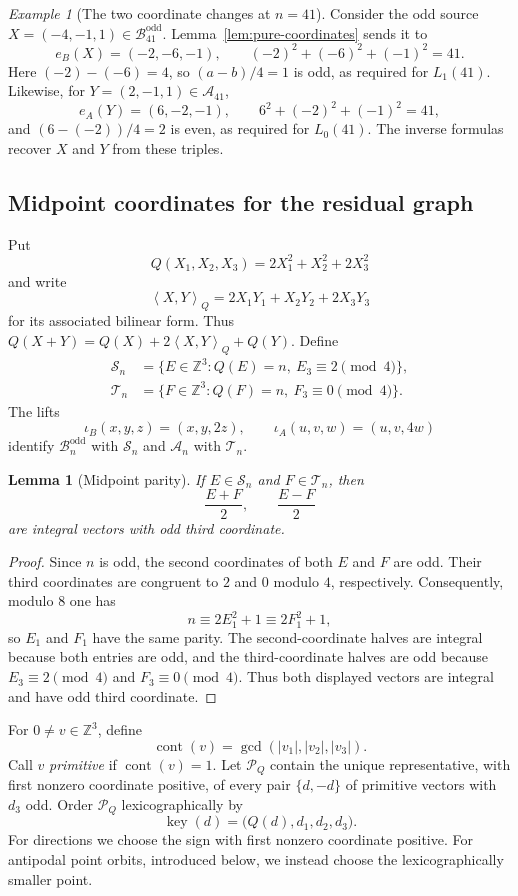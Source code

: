 \documentclass[11pt]{amsart}
\newtheorem{lemma}[theorem]{Lemma}
\theoremstyle{definition}
\theoremstyle{remark}
\newtheorem{example}[theorem]{Example}
\newcommand{\Z}{\mathbb Z}
\newcommand{\An}{\mathcal A_n}
\newcommand{\Bodd}{\mathcal B_n^{\mathrm{odd}}}
\newcommand{\Sn}{\mathcal S_n}
\newcommand{\Tn}{\mathcal T_n}
\newcommand{\Dcal}{\mathcal P_Q}
\newcommand{\key}{\operatorname{key}}
\newcommand{\cont}{\operatorname{cont}}
\newcommand{\Qip}[2]{\left\langle #1,#2\right\rangle_Q}
\begin{document}
\begin{example}[The two coordinate changes at $n=41$]
\label{ex:coordinates-41}
Consider the odd source $X=(-4,-1,1)\in\mathcal B_{41}^{\mathrm{odd}}$.
Lemma~\ref{lem:pure-coordinates} sends it to
\[
 e_B(X)=(-2,-6,-1),
 \qquad
 (-2)^2+(-6)^2+(-1)^2=41.
\]
Here $(-2)-(-6)=4$, so $(a-b)/4=1$ is odd, as required for $L_1(41)$.
Likewise, for $Y=(2,-1,1)\in\mathcal A_{41}$,
\[
 e_A(Y)=(6,-2,-1),
 \qquad
 6^2+(-2)^2+(-1)^2=41,
\]
and $(6-(-2))/4=2$ is even, as required for $L_0(41)$.  The inverse formulas
recover $X$ and $Y$ from these triples.
\end{example}

\subsection{Midpoint coordinates for the residual graph}
Put
\[
 Q(X_1,X_2,X_3)=2X_1^2+X_2^2+2X_3^2
\]
and write
\[
 \Qip{X}{Y}=2X_1Y_1+X_2Y_2+2X_3Y_3
\]
for its associated bilinear form.  Thus
$Q(X+Y)=Q(X)+2\Qip{X}{Y}+Q(Y)$.  Define
\begin{align*}
 \Sn&=\{E\in\Z^3:Q(E)=n,\ E_3\equiv2\pmod4\},\\
 \Tn&=\{F\in\Z^3:Q(F)=n,\ F_3\equiv0\pmod4\}.
\end{align*}
The lifts
\[
 \iota_B(x,y,z)=(x,y,2z),
 \qquad
 \iota_A(u,v,w)=(u,v,4w)
\]
identify $\Bodd$ with $\Sn$ and $\An$ with $\Tn$.

\begin{lemma}[Midpoint parity]\label{lem:midpoint-parity}
If $E\in\Sn$ and $F\in\Tn$, then
\[
 \frac{E+F}{2},\qquad \frac{E-F}{2}
\]
are integral vectors with odd third coordinate.
\end{lemma}

\begin{proof}
Since $n$ is odd, the second coordinates of both $E$ and $F$ are odd.  Their
third coordinates are congruent to $2$ and $0$ modulo $4$, respectively.
Consequently, modulo $8$ one has
\[
 n\equiv2E_1^2+1\equiv2F_1^2+1,
\]
so $E_1$ and $F_1$ have the same parity.  The second-coordinate halves are
integral because both entries are odd, and the third-coordinate halves are
odd because $E_3\equiv2\pmod4$ and $F_3\equiv0\pmod4$.  Thus both displayed
vectors are integral and have odd third coordinate.
\end{proof}

For $0\ne v\in\Z^3$, define
\[
 \cont(v)=\gcd(|v_1|,|v_2|,|v_3|).
\]
Call $v$ \emph{primitive} if $\cont(v)=1$.  Let $\Dcal$ contain the unique
representative, with first nonzero coordinate positive, of every pair
$\{d,-d\}$ of primitive vectors with $d_3$ odd.  Order $\Dcal$
lexicographically by
\begin{equation}\label{eq:direction-key}
 \key(d)=\bigl(Q(d),d_1,d_2,d_3\bigr).
\end{equation}
For directions we choose the sign with first nonzero coordinate positive.
For antipodal point orbits, introduced below, we instead choose the
lexicographically smaller point.
\end{document}
